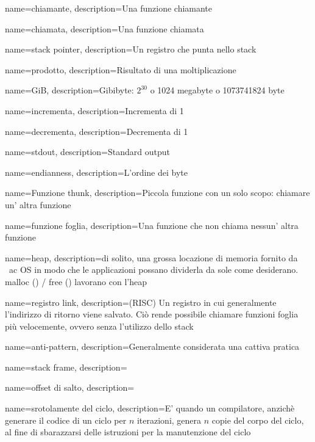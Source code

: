 {
  name=chiamante,
  description={Una funzione chiamante}
}

{
  name=chiamata,
  description={Una funzione chiamata}
}

{
  name={stack pointer},
  description={Un registro che punta nello stack}
}

{
  name={prodotto},
  description={Risultato di una moltiplicazione}
}

{
  name={GiB},
  description={Gibibyte: $2^{30}$ o 1024 megabyte o 1073741824 byte}
}

{
  name={incrementa},
  description={Incrementa di 1}
}

{
  name={decrementa},
  description={Decrementa di 1}
}

{
  name={stdout},
  description={Standard output}
}

{
  name={endianness},
  description={L'ordine dei byte}
}

{
  name={Funzione thunk},
  description={Piccola funzione con un solo scopo: chiamare un' altra funzione}
}

{
  name={funzione foglia},
  description={Una funzione che non chiama nessun' altra funzione}
}

{
  name={heap},
  description={di solito, una grossa locazione di memoria fornito da \ ac {OS} in modo che le applicazioni possano dividerla da sole come desiderano. malloc () / free () lavorano con l'heap}
}

{
  name={registro link},
  description={(RISC) {Un registro in cui generalmente l'indirizzo di ritorno viene salvato.
Ciò rende possibile chiamare funzioni foglia più velocemente, ovvero senza l'utilizzo dello stack}}
}

{
  name={anti-pattern},
  description={Generalmente considerata una cattiva pratica}
}

{
  name={stack frame},
  description={\ITph{}}
}

{
  name={offset di salto},
  description={\ITph{}}
}

{
  name={srotolamente del ciclo},
  description={E' quando un compilatore, anzichè generare il codice di un ciclo per $n$ iterazioni, genera $n$ copie del corpo del ciclo, al fine di sbarazzarsi delle istruzioni per la manutenzione del ciclo}
}

